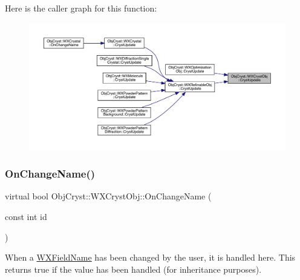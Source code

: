 Here is the caller graph for this function\+:
\nopagebreak
\begin{figure}[H]
\begin{center}
\leavevmode
\includegraphics[width=350pt]{class_obj_cryst_1_1_w_x_cryst_obj_a1ea28fa0a66b5163b66bf42a8d1451b3_icgraph}
\end{center}
\end{figure}
\mbox{\label{class_obj_cryst_1_1_w_x_cryst_obj_a3736357599263df7e550790753c040a3}} 
\subsubsection{\texorpdfstring{OnChangeName()}{OnChangeName()}}
{\footnotesize\ttfamily virtual bool Obj\+Cryst\+::\+W\+X\+Cryst\+Obj\+::\+On\+Change\+Name (\begin{DoxyParamCaption}\item[{const int}]{id }\end{DoxyParamCaption})\hspace{0.3cm}{\ttfamily [pure virtual]}}

When a \mbox{\hyperlink{class_obj_cryst_1_1_w_x_field_name}{W\+X\+Field\+Name}} has been changed by the user, it is handled here. This returns true if the value has been handled (for inheritance purposes). 

